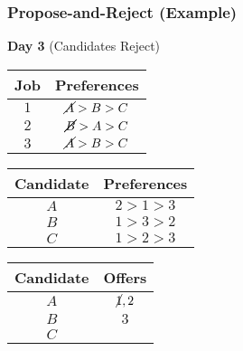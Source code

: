 \documentclass{beamer}
\begin{document}
\begin{frame}
    \frametitle{Propose-and-Reject (Example)}
    {\bf Day 3} (Candidates Reject)
    \begin{center}
        \begin{tabular}{c|c}
            Job & Preferences \\
            \hline
            $1$ & $\cancel{A}>B>C$\\
            $2$ & $\cancel{B}>A>C$\\
            $3$ & $\cancel{A}>B>C$
        \end{tabular}
        \hspace{10pt}
        \begin{tabular}{c|c}
            Candidate & Preferences \\
            \hline
            $A$ & $2>1>3$\\
            $B$ & $1>3>2$\\
            $C$ & $1>2>3$
        \end{tabular}
    \end{center}
    \begin{center}
        \begin{tabular}{c|c}
            Candidate & Offers \\
            \hline
            $A$ & $\cancel{1},2$ \\
            $B$ & $3$ \\
            $C$ & 
        \end{tabular}
    \end{center}
\end{frame}
\end{document}
